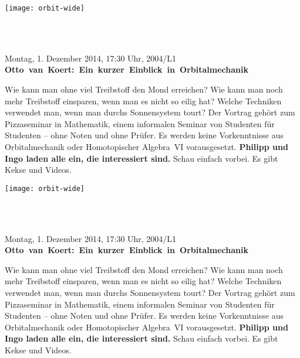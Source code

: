 \documentclass[a4paper,ngerman,landscape]{scrartcl}
\begin{document}
\begin{center}
  \Huge
  \vspace*{0.0em}
  \texttt{[image: orbit-wide]}
  \vspace{0.5em}

  \scalebox{2.5}{Aufgepasst!}\\[0.2em]
  \scalebox{2.5}{Heute Abend gibt es einen}\\[0.2em]
  \vspace{0.7em}

  Montag, 1. Dezember 2014, 17:30 Uhr, 2004/L1 \\
  \mbox{\textbf{Otto van Koert: Ein kurzer Einblick in Orbitalmechanik}}

  \Large
  \begin{minipage}{0.80\textwidth}
    \setlength\parskip{\medskipamount}
    \vspace{0.3em}
    Wie kann man ohne viel Treibstoff den Mond erreichen? Wie kann man noch
    mehr Treibstoff einsparen, wenn man es nicht so eilig hat? Welche Techniken
    verwendet man, wenn man durchs Sonnensystem tourt? Der Vortrag gehört zum
    Pizzaseminar in Mathematik, einem informalen Seminar von Studenten für
    Studenten -- ohne Noten und ohne Prüfer. Es werden keine Vorkenntnisse aus
    Orbitalmechanik oder Homotopischer Algebra~VI vorausgesetzt.
    \textbf{Philipp und Ingo laden alle ein, die interessiert sind.}
    Schau einfach vorbei. Es gibt Kekse und Videos.
  \end{minipage}
\end{center}

\begin{center}
  \Huge
  \vspace*{0.0em}
  \texttt{[image: orbit-wide]}
  \vspace{0.5em}

  \scalebox{2.4}{Geh da nicht hin!}\\[0.6em]
  \\[0.6em]
  \vspace{1em}

  Montag, 1. Dezember 2014, 17:30 Uhr, 2004/L1 \\
  \mbox{\textbf{Otto van Koert: Ein kurzer Einblick in Orbitalmechanik}}

  \Large
  \begin{minipage}{0.80\textwidth}
    \setlength\parskip{\medskipamount}
    \vspace{0.3em}
    Wie kann man ohne viel Treibstoff den Mond erreichen? Wie kann man noch
    mehr Treibstoff einsparen, wenn man es nicht so eilig hat? Welche Techniken
    verwendet man, wenn man durchs Sonnensystem tourt? Der Vortrag gehört zum
    Pizzaseminar in Mathematik, einem informalen Seminar von Studenten für
    Studenten -- ohne Noten und ohne Prüfer. Es werden keine Vorkenntnisse aus
    Orbitalmechanik oder Homotopischer Algebra~VI vorausgesetzt.
    \textbf{Philipp und Ingo laden alle ein, die interessiert sind.}
    Schau einfach vorbei. Es gibt Kekse und Videos.
  \end{minipage}
\end{center}
\end{document}
